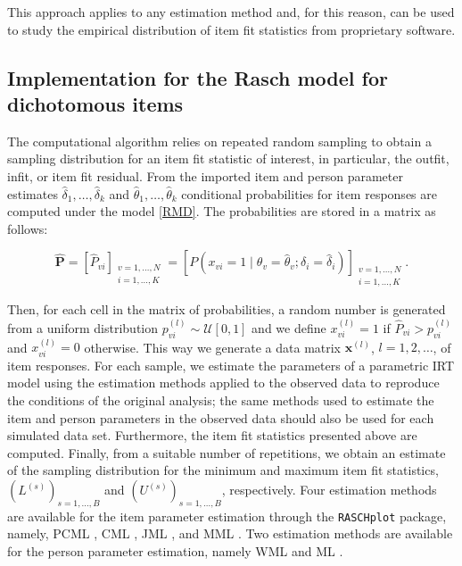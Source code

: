 \documentclass[11pt,a4paper]{article}
\begin{document}
This approach applies to any estimation method and, for this reason, can be used to study the empirical distribution of item fit statistics from proprietary software. 

\subsection{Implementation for the Rasch model for dichotomous items}

The computational algorithm relies on repeated random sampling to obtain a sampling distribution for an item fit statistic of interest, in particular, the outfit, infit, or item fit residual. From the imported item and person parameter estimates $\hat\delta_1,\ldots,\hat\delta_k$ and $\hat\theta_1,\ldots,\hat\theta_k$ conditional probabilities for item responses are computed under the model \eqref{RMD}. The probabilities are stored in a matrix as follows:

\begin{equation}
\boldsymbol{\hat{P}}=\left[\hat{P}_{vi}\right]_{\substack{v=1,\ldots,N \\ i=1,\ldots,K}}=\left[P(x_{vi}=1 \mid \theta_v=\hat\theta_v; \delta_i=\hat\delta_i)\right]_{\substack{v=1,\ldots,N \\ i=1,\ldots,K}}.
\label{probability-matrix}
\end{equation}

Then, for each cell in the matrix of probabilities, a random number is generated from a uniform distribution $p^{(l)}_{vi} \sim \mathcal{U}[0,1]$ and we define $x^{(l)}_{vi}=1$ if $\hat{P}_{vi} > p^{(l)}_{vi}$ and $x^{(l)}_{vi}=0$ otherwise. This way we generate a data matrix  $\mathbf{x}^{(l)}$, $l=1,2,\ldots$, of item responses. For each sample, we estimate the parameters of a parametric IRT model using the estimation methods applied to the observed data to reproduce the conditions of the original analysis; the same methods used to estimate the item and person parameters in the observed data should also be used for each simulated data set. Furthermore, the item fit statistics presented above are computed. Finally, from a suitable number of repetitions, we obtain an estimate of the sampling distribution for the minimum and maximum item fit statistics, $(L^{(s)})_{s=1,\ldots,B}$ and $(U^{(s)})_{s=1,\ldots,B}$, respectively. 
Four estimation  methods are available for the item parameter estimation through the \texttt{RASCHplot} package, namely, PCML \cite{Robitzsch-2022}, CML \cite{Mair-et-al-2021}, JML  \cite{Robitzsch-Kiefer-Wu-et-al-2022}, and MML \cite{Robitzsch-Kiefer-Wu-et-al-2022}. Two estimation methods are available for the person parameter estimation, namely WML and ML \cite{Robitzsch-2022}. 
\end{document}
